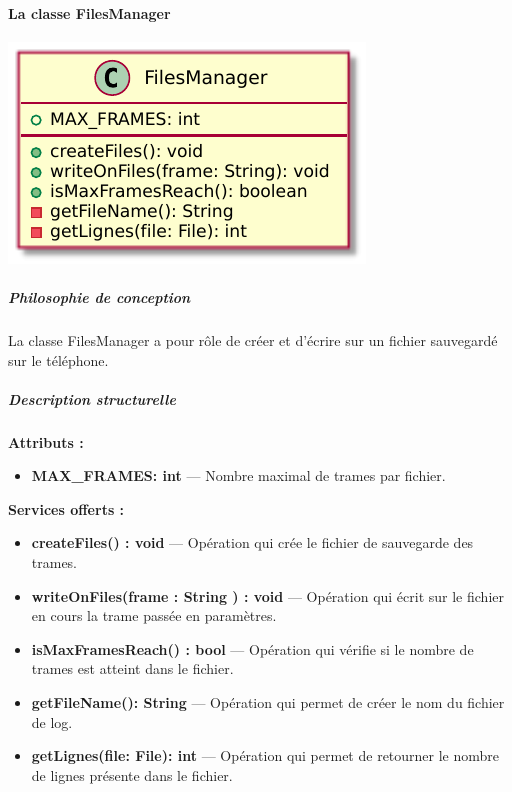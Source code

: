 \paragraph{La classe FilesManager}

\begin{minipage}
    {\linewidth}
    \centering
    \includegraphics[width=0.80\linewidth]{../schemas/Conception_detaillee/classe_FilesManager.pdf}
\end{minipage}

\subparagraph{Philosophie de conception \newline} 

\medspace

La classe FilesManager a pour rôle de créer et d'écrire sur un fichier sauvegardé sur le téléphone. 

\subparagraph{Description structurelle \newline}

\medspace

\textbf{Attributs :}

\begin{itemize}
    \item \textbf{MAX\_FRAMES: int} --- Nombre maximal de trames par fichier. 
\end{itemize}

\textbf{Services offerts :}

\begin{itemize}
    \item \textbf{createFiles() : void} --- Opération qui crée le fichier de sauvegarde des trames. 
    \item \textbf{writeOnFiles(frame : String ) : void } --- Opération qui écrit sur le fichier en cours la trame passée en paramètres. 
    \item \textbf{isMaxFramesReach() : bool } --- Opération qui vérifie si le nombre de trames est atteint dans le fichier. 
    \item \textbf{getFileName(): String} --- Opération qui permet de créer le nom du fichier de log.
    \item \textbf{getLignes(file: File): int} --- Opération qui permet de retourner le nombre de lignes présente dans le fichier. 
\end{itemize}